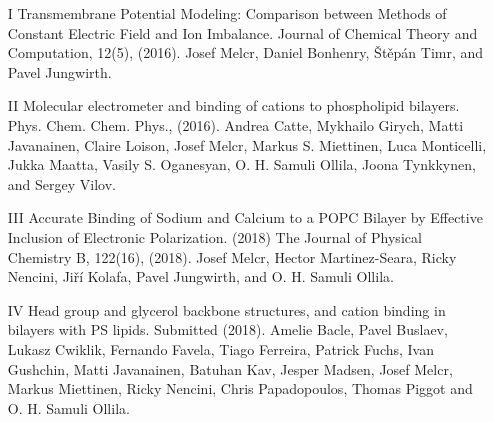 \documentclass[12pt,a4paper,twoside,openright]{report}
\let\openright=\cleardoublepage
\begin{document}
\begin{itemize}
\item[I] 
Transmembrane Potential Modeling: Comparison between Methods of Constant Electric
Field and Ion Imbalance. 
Journal of Chemical Theory and Computation, 12(5), (2016). 
Josef Melcr, Daniel Bonhenry, Štěpán Timr, and Pavel Jungwirth. 

\item[II] 
Molecular electrometer and binding of cations to phospholipid bilayers. 
Phys. Chem. Chem. Phys., (2016).
Andrea Catte, Mykhailo Girych, Matti Javanainen, Claire Loison, Josef Melcr,
Markus S. Miettinen, Luca Monticelli, Jukka Maatta, Vasily S. Oganesyan,
O. H. Samuli Ollila, Joona Tynkkynen, and Sergey Vilov. 

\item[III]
Accurate Binding of Sodium and Calcium to a POPC Bilayer by Effective Inclusion of Electronic Polarization. (2018)
The Journal of Physical Chemistry B, 122(16), (2018).
Josef Melcr, Hector Martinez-Seara, Ricky Nencini, Jiří Kolafa, Pavel Jungwirth,
and O. H. Samuli Ollila. 

\item[IV]
Head group and glycerol backbone structures,
and cation binding in bilayers with PS lipids. Submitted (2018).
Amelie Bacle, Pavel Buslaev, Lukasz Cwiklik, Fernando Favela, Tiago Ferreira,
Patrick Fuchs, Ivan Gushchin, Matti Javanainen, Batuhan Kav, Jesper Madsen, 
Josef Melcr, Markus Miettinen, Ricky Nencini,  Chris Papadopoulos, Thomas Piggot 
and O. H. Samuli Ollila. 

\end{itemize}

\appendix

\openright
\end{document}
